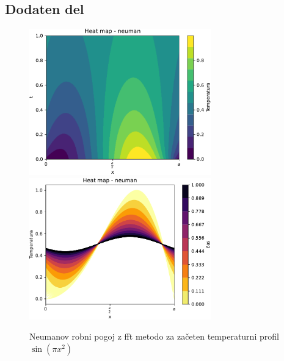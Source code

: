 \subsection{Dodaten del}
\begin{figure}[h]
    \centering
    \includegraphics[width=0.7\textwidth]{pdfs/heat_map-neuman.pdf}
    \includegraphics[width=0.7\textwidth]{pdfs/heat_map-neuman2.pdf}
    \caption{Neumanov robni pogoj z fft metodo za začeten temperaturni profil
    $\sin(\pi x^2)$}
\end{figure}
\newpage

